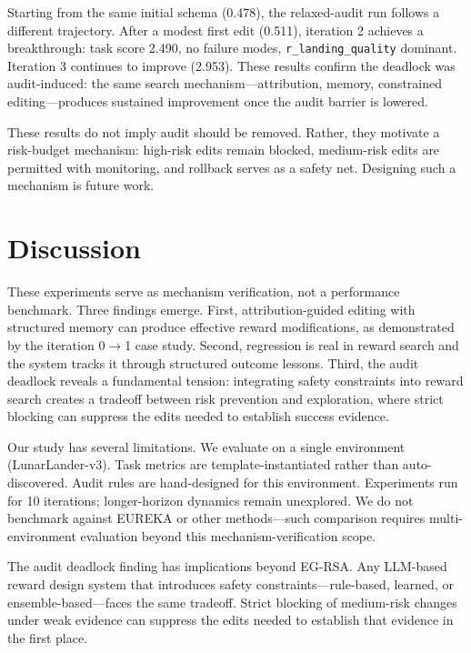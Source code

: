\documentclass[11pt]{article}
\begin{document}
Starting from the same initial schema (0.478), the relaxed-audit run follows a different trajectory. After a modest first edit (0.511), iteration 2 achieves a breakthrough: task score 2.490, no failure modes, \texttt{r\_landing\_quality} dominant. Iteration 3 continues to improve (2.953). These results confirm the deadlock was audit-induced: the same search mechanism---attribution, memory, constrained editing---produces sustained improvement once the audit barrier is lowered.

These results do not imply audit should be removed. Rather, they motivate a risk-budget mechanism: high-risk edits remain blocked, medium-risk edits are permitted with monitoring, and rollback serves as a safety net. Designing such a mechanism is future work.

\section{Discussion}
\label{sec:discussion}

These experiments serve as mechanism verification, not a performance benchmark. Three findings emerge. First, attribution-guided editing with structured memory can produce effective reward modifications, as demonstrated by the iteration 0$\to$1 case study. Second, regression is real in reward search and the system tracks it through structured outcome lessons. Third, the audit deadlock reveals a fundamental tension: integrating safety constraints into reward search creates a tradeoff between risk prevention and exploration, where strict blocking can suppress the edits needed to establish success evidence.

Our study has several limitations. We evaluate on a single environment (LunarLander-v3). Task metrics are template-instantiated rather than auto-discovered. Audit rules are hand-designed for this environment. Experiments run for 10 iterations; longer-horizon dynamics remain unexplored. We do not benchmark against EUREKA or other methods---such comparison requires multi-environment evaluation beyond this mechanism-verification scope.

The audit deadlock finding has implications beyond EG-RSA. Any LLM-based reward design system that introduces safety constraints---rule-based, learned, or ensemble-based---faces the same tradeoff. Strict blocking of medium-risk changes under weak evidence can suppress the edits needed to establish that evidence in the first place.
\end{document}
